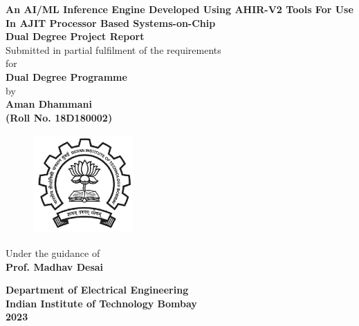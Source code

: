 \documentclass[a4paper,12pt, final]{report}
\begin{document}
  \thispagestyle{empty}
  \vspace*{1cm}
  {\centering     
  \textbf{\LARGE An AI/ML Inference Engine Developed Using AHIR-V2 Tools For Use In AJIT Processor Based Systems-on-Chip}\\
  \vspace{1.20cm}
  \textbf{\large Dual Degree Project Report}\\
  \vspace{1cm}
  {Submitted in partial fulfilment of the requirements}\\
  \vspace{0.25cm}
  {for}\\
  \vspace{1cm}
  \textbf{ Dual Degree Programme}\\
  \vspace{1.50cm}
  {by}\\
  \vspace{0.20cm}
  \textbf{\large Aman Dhammani}\\
  \vspace{0.25cm}
  \textbf{\large (Roll No. 18D180002)}\\
  \vspace{1.8cm}
    \begin{figure}[htb]
    \begin{center}
    \includegraphics[height=1.5in,width=1.5in]{iitblogo.png}
    \end{center}
    \end{figure}
  \vspace{1.450cm}
  {Under the guidance of}\\
  \vspace{0.20cm}
  \textbf{\large Prof. Madhav Desai}\\
    \vspace{0.30cm}

    
  {\textbf{Department of Electrical Engineering}}\\
  {\textbf{Indian Institute of Technology Bombay}}\\
  {\textbf{2023}}
 
 }
\end{document}

